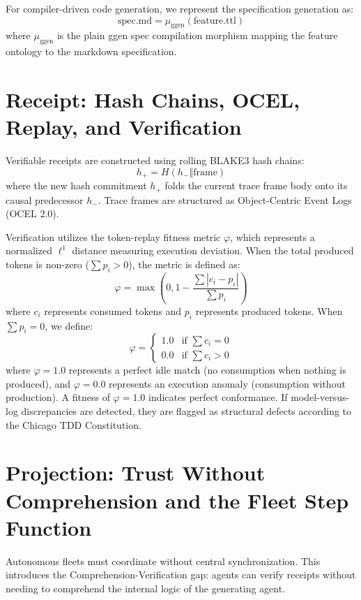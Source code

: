 \documentclass[11pt,a4paper]{article}
\begin{document}
For compiler-driven code generation, we represent the specification generation as:
\begin{equation}
\text{spec.md} = \mu_{\text{ggen}}(\text{feature.ttl})
\end{equation}
where $\mu_{\text{ggen}}$ is the plain ggen spec compilation morphism mapping the feature ontology to the markdown specification.

\section{Receipt: Hash Chains, OCEL, Replay, and Verification}
Verifiable receipts are constructed using rolling BLAKE3 hash chains:
\begin{equation}
h_+ = H(h_- \mathbin{\Vert} \text{frame})
\end{equation}
where the new hash commitment $h_+$ folds the current trace frame body onto its causal predecessor $h_-$. Trace frames are structured as Object-Centric Event Logs (OCEL 2.0). 

Verification utilizes the token-replay fitness metric $\varphi$, which represents a normalized $\ell^1$ distance measuring execution deviation. When the total produced tokens is non-zero ($\sum p_i > 0$), the metric is defined as:
\begin{equation}
\varphi = \max\left(0, 1 - \frac{\sum |c_i - p_i|}{\sum p_i}\right)
\end{equation}
where $c_i$ represents consumed tokens and $p_i$ represents produced tokens. When $\sum p_i = 0$, we define:
\begin{equation}
\varphi = \begin{cases}
1.0 & \text{if } \sum c_i = 0 \\
0.0 & \text{if } \sum c_i > 0
\end{cases}
\end{equation}
where $\varphi = 1.0$ represents a perfect idle match (no consumption when nothing is produced), and $\varphi = 0.0$ represents an execution anomaly (consumption without production). A fitness of $\varphi = 1.0$ indicates perfect conformance. If model-versus-log discrepancies are detected, they are flagged as structural defects according to the Chicago TDD Constitution.

\section{Projection: Trust Without Comprehension and the Fleet Step Function}
Autonomous fleets must coordinate without central synchronization. This introduces the Comprehension\allowbreak{}-Verification gap: agents can verify receipts without needing to comprehend the internal logic of the generating agent. 
\end{document}
